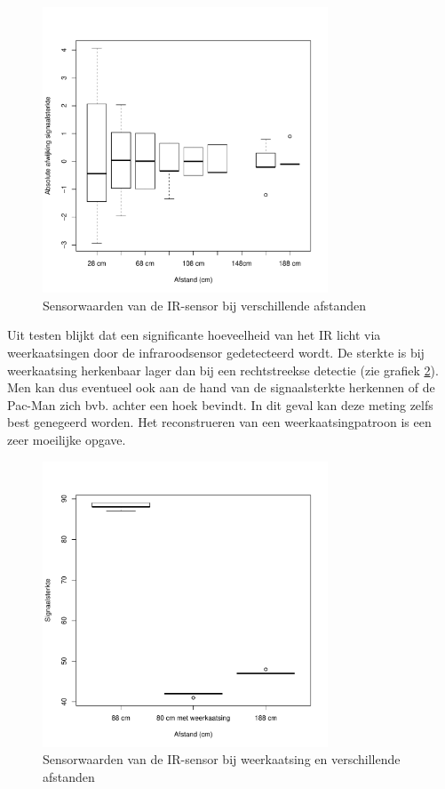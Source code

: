 \documentclass[12pt,a4paper]{report}
\begin{document}
\begin{figure}
\begin{center}
 \includegraphics[width=85mm]{./resources/bloxplotIR.pdf}
 \caption{Sensorwaarden van de IR-sensor bij verschillende afstanden}
 \label{fig:boxplotIR}
\end{center}
\end{figure}

Uit testen blijkt dat een significante hoeveelheid van het IR licht via weerkaatsingen door de infraroodsensor gedetecteerd wordt.
De sterkte is bij weerkaatsing herkenbaar lager dan bij een rechtstreekse detectie (zie grafiek \ref{fig:boxplotSpiegeling}).  Men kan dus eventueel ook aan de hand van de signaalsterkte herkennen of de Pac-Man zich bvb. achter een hoek bevindt. In dit geval kan deze meting zelfs best genegeerd worden. Het reconstrueren van een weerkaatsingpatroon is een zeer moeilijke opgave.

\begin{figure}
\begin{center}
 \includegraphics[width=85mm]{./resources/boxplotSpiegeling.pdf}
 \caption{Sensorwaarden van de IR-sensor bij weerkaatsing en verschillende afstanden}
 \label{fig:boxplotSpiegeling}
\end{center}
\end{figure}
\end{document}
